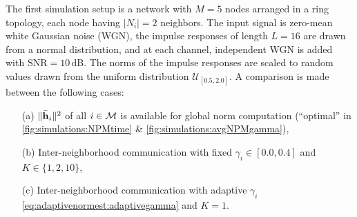 \documentclass{article}
\begin{document}
The first simulation setup is a network with \(M=5\) nodes arranged in a ring topology, each node having \(|N_i|=2\) neighbors.
The input signal is zero-mean white Gaussian noise (WGN), the impulse responses of length \(L=16\) are drawn from a normal distribution, and at each channel, independent WGN is added with \(\text{SNR}=10\,\text{dB}\).
The norms of the impulse responses are scaled to random values drawn from the uniform distribution \(\mathcal{U}_{[0.5,2.0]}\).
A comparison is made between the following cases:
\begin{itemize}
    \itemsep-0.2em
    \item[(a)] \(\|\bar{\bm{\mathrm{h}}}_i\|^2\) of all \(i \in \mathcal{M}\) is available for global norm computation (``optimal'' in \autoref{fig:simulations:NPMtime} \& \autoref{fig:simulations:avgNPMgamma}),
    \item[(b)] Inter-neighborhood communication with fixed \(\gamma_i \in [0.0, 0.4]\) and \(K \in \{1,2,10\}\),
    \item[(c)] Inter-neighborhood communication with adaptive \(\gamma_i\) \eqref{eq:adaptivenormest:adaptivegamma} and \(K=1\).
\end{itemize}
\end{document}
